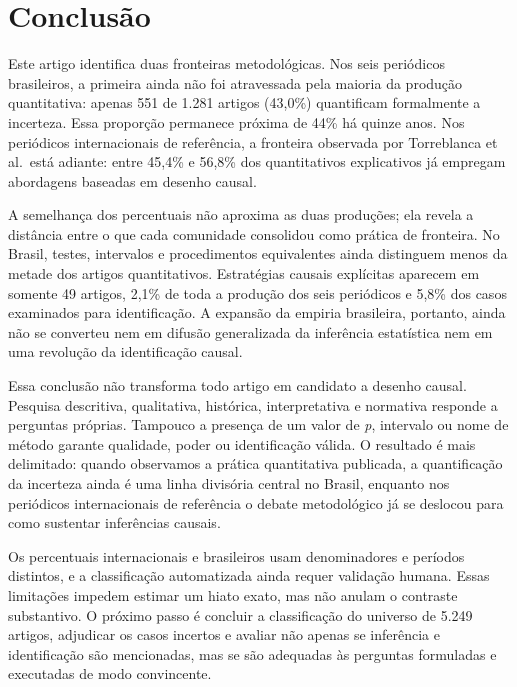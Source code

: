 \documentclass[
]{article}
\begin{document}
\section{Conclusão}\label{conclusuxe3o}

Este artigo identifica duas fronteiras metodológicas. Nos seis
periódicos brasileiros, a primeira ainda não foi atravessada pela
maioria da produção quantitativa: apenas 551 de 1.281 artigos (43,0\%)
quantificam formalmente a incerteza. Essa proporção permanece próxima de
44\% há quinze anos. Nos periódicos internacionais de referência, a
fronteira observada por Torreblanca et al.~está adiante: entre 45,4\% e
56,8\% dos quantitativos explicativos já empregam abordagens baseadas em
desenho causal.

A semelhança dos percentuais não aproxima as duas produções; ela revela
a distância entre o que cada comunidade consolidou como prática de
fronteira. No Brasil, testes, intervalos e procedimentos equivalentes
ainda distinguem menos da metade dos artigos quantitativos. Estratégias
causais explícitas aparecem em somente 49 artigos, 2,1\% de toda a
produção dos seis periódicos e 5,8\% dos casos examinados para
identificação. A expansão da empiria brasileira, portanto, ainda não se
converteu nem em difusão generalizada da inferência estatística nem em
uma revolução da identificação causal.

Essa conclusão não transforma todo artigo em candidato a desenho causal.
Pesquisa descritiva, qualitativa, histórica, interpretativa e normativa
responde a perguntas próprias. Tampouco a presença de um valor de
\emph{p}, intervalo ou nome de método garante qualidade, poder ou
identificação válida. O resultado é mais delimitado: quando observamos a
prática quantitativa publicada, a quantificação da incerteza ainda é uma
linha divisória central no Brasil, enquanto nos periódicos
internacionais de referência o debate metodológico já se deslocou para
como sustentar inferências causais.

Os percentuais internacionais e brasileiros usam denominadores e
períodos distintos, e a classificação automatizada ainda requer
validação humana. Essas limitações impedem estimar um hiato exato, mas
não anulam o contraste substantivo. O próximo passo é concluir a
classificação do universo de 5.249 artigos, adjudicar os casos incertos
e avaliar não apenas se inferência e identificação são mencionadas, mas
se são adequadas às perguntas formuladas e executadas de modo
convincente.

\newpage
\end{document}
